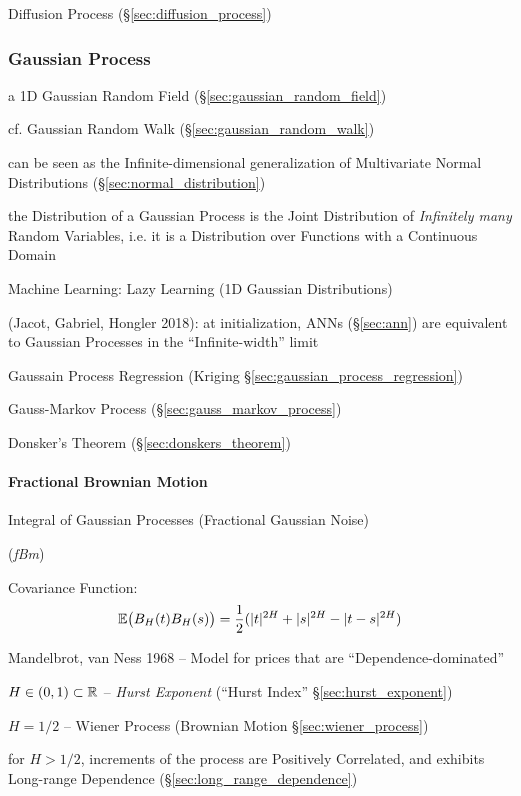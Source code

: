 Diffusion Process (\S\ref{sec:diffusion_process})



\subsubsection{Gaussian Process}\label{sec:gaussian_process}

a 1D Gaussian Random Field (\S\ref{sec:gaussian_random_field})

cf. Gaussian Random Walk (\S\ref{sec:gaussian_random_walk})

can be seen as the Infinite-dimensional generalization of Multivariate Normal
Distributions (\S\ref{sec:normal_distribution})

the Distribution of a Gaussian Process is the Joint Distribution of
\emph{Infinitely many} Random Variables, i.e. it is a Distribution over
Functions with a Continuous Domain

Machine Learning: Lazy Learning (1D Gaussian Distributions)

(Jacot, Gabriel, Hongler 2018): at initialization, ANNs (\S\ref{sec:ann}) are
equivalent to Gaussian Processes in the ``Infinite-width'' limit

Gaussain Process Regression (Kriging \S\ref{sec:gaussian_process_regression})

\fist Gauss-Markov Process (\S\ref{sec:gauss_markov_process})

\fist Donsker's Theorem (\S\ref{sec:donskers_theorem})



\paragraph{Fractional Brownian Motion}\label{sec:fractional_brownian}\hfill

Integral of Gaussian Processes (Fractional Gaussian Noise)

(\emph{fBm})

Covariance Function:
\[
  \mathbb{E}\big(B_H(t) B_H(s)\big) =
    \frac{1}{2} (|t|^{2H} + |s|^{2H} - |t - s|^{2H})
\]

Mandelbrot, van Ness 1968 -- Model for prices that are ``Dependence-dominated''

$H \in (0,1) \subset \mathbb{R}$ -- \emph{Hurst Exponent} (``Hurst Index''
\S\ref{sec:hurst_exponent})

$H = 1/2$ -- Wiener Process (Brownian Motion \S\ref{sec:wiener_process})

for $H > 1/2$, increments of the process are Positively Correlated, and exhibits
Long-range Dependence (\S\ref{sec:long_range_dependence})

